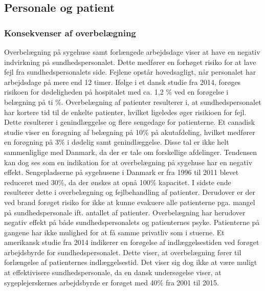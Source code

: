 \subsection{Personale og patient}

\subsubsection{Konsekvenser af overbelægning}

Overbelægning på sygehuse samt forlængede arbejdsdage viser at have en negativ indvirkning på sundhedspersonalet.\citep{Kjeldsen2015} Dette medfører en forhøget risiko for at lave fejl fra sundhedspersonalets side. Fejlene opstår hovedsagligt, når personalet har arbejdsdage på mere end 12 timer.\citep{Dinges2004} Ifølge i et dansk studie fra 2014, forøges risikoen for dødeligheden på hospitalet med ca. 1,2 \% ved en forøgelse i belægning på ti \%.\citep{Madsen2014} Overbelægning af patienter resulterer i, at sundhedspersonalet har kortere tid til de enkelte patienter, hvilket ligeledes øger risikioen for fejl. Dette resulterer i genindlæggelse og flere sengedage for patienterne. Et canadisk studie viser en forøgning af belægning på 10\% på akutafdeling, hvilket medfører en forøgning på 3\% i dødelig samt genindlæggelse.\citep{McCusker2014} Disse tal er ikke helt sammenliglige med Danmark, da der er tale om forskellige afdelinger. Tendensen kan dog ses som en indikation for at overbelægning på sygehuse har en negativ effekt.
Sengepladserne på sygehusene i Danmark er fra 1996 til 2011 blevet reduceret med 30\%, da der ønskes at opnå 100\% kapacitet.\citep{Madsen2014} I sidste ende resulterer dette i overbelægning og fejlbehandling af patienter. Derudover er der ved brand forøget risiko for ikke at kunne evakuere alle patienterne pga. mangel på sundhedspersonale ift. antallet af patienter.\citep{Madsen2014} 
Overbelægning har herudover negativ effekt på både sundhedspersonalets og patienternes psyke. Patienterne på gangene har ikke mulighed for at få samme privatliv som i stuerne.\citep{Madsen2014}  Et amerikansk studie fra 2014 indikerer en forøgelse af indlæggelsestiden ved forøget arbejdsbyrde for sundhedspersonalet\citep{Elliott2014}. Dette viser, at overbelægning fører til forlængelse af patienternes indlæggelsestid. Det viser sig dog ikke at være muligt at effektivisere sundhedspersonale, da en dansk undersøgelse viser, at sygeplejerskernes arbejdsbyrde er forøget med 40\% fra 2001 til 2015.\citep{Kjeldsen2015}


